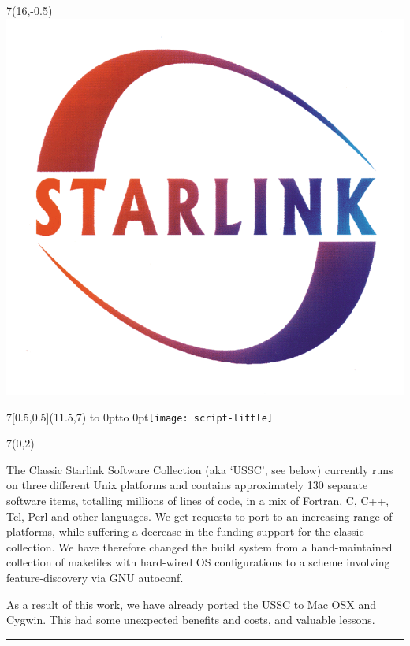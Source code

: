\documentclass[a0,portrait]{a0poster-ng}
\newcommand{\autoconf}{{\ttfamily\small autoconf}}
\newcommand{\autoconf}{{\ttfamily\normalsize autoconf}}
\begin{document}
\begin{textblock}{7}(16,-0.5)
\includegraphics{starlink_logo}
\end{textblock}



\begin{textblock}{7}[0.5,0.5](11.5,7)
\vbox to 0pt{\vss\hbox to 0pt{\hss\texttt{[image: script-little]}\hss}\vss}%
\end{textblock}



\begin{textblock}{7}(0,2)

\slshape

The Classic Starlink Software Collection (aka `USSC', see below)
currently runs on three different Unix platforms and contains
approximately 130 separate software items, totalling millions of lines
of code, in a mix of Fortran, C, C++, Tcl, Perl and other languages.
We get requests
to port to an increasing range of platforms, while suffering a
decrease in the funding support for the classic collection.  We have
therefore changed the build system from a hand-maintained collection
of makefiles with hard-wired OS configurations to a scheme involving
feature-discovery via GNU \autoconf.

As a result of this work, we have already ported the USSC to Mac OSX
and Cygwin.  This had some unexpected benefits and costs, and
valuable lessons.

\bigskip
\hrule
\end{textblock}
\end{document}
